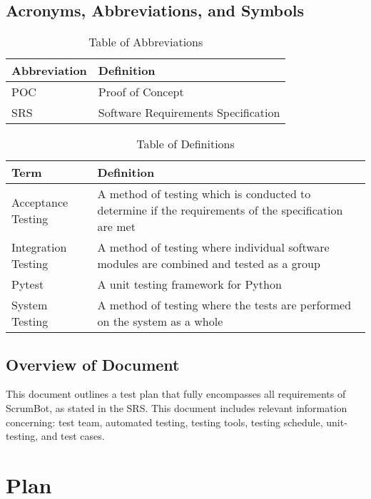 \documentclass[12pt, titlepage]{article}
\begin{document}
\subsection{Acronyms, Abbreviations, and Symbols}
    
\begin{table}[hbp]
    \caption{Table of Abbreviations}
    \label{Table}
    \begin{tabularx}{\textwidth}{p{3cm}X}
        \toprule
        \textbf{Abbreviation} & \textbf{Definition} \\
        \midrule
        POC & Proof of Concept\\
        SRS & Software Requirements Specification\\
        \bottomrule
    \end{tabularx}
\end{table}

\begin{table}[!htbp]
    \caption{Table of Definitions}
    \label{Table}
    \begin{tabularx}{\textwidth}{p{3cm}X}
        \toprule
        \textbf{Term} & \textbf{Definition}\\
        \midrule
        Acceptance Testing & A method of testing which is conducted to determine if the requirements of the specification are met\\
        Integration Testing & A method of testing where individual software modules are combined and tested as a group\\
        Pytest & A unit testing framework for Python\\
        System Testing & A method of testing where the tests are performed on the system as a whole\\
        \bottomrule
    \end{tabularx}
\end{table} 

\subsection{Overview of Document}
This document outlines a test plan that fully encompasses all requirements of ScrumBot, as stated in the SRS. This document includes relevant information concerning: test team, automated testing, testing tools, testing schedule, unit-testing, and test cases.

\section{Plan}
\end{document}
